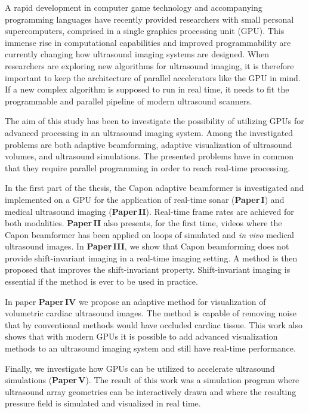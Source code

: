 \documentclass[10pt,b5paper,twoside]{book}
\begin{document}

A rapid development in computer game technology and accompanying programming languages have recently provided researchers with small personal supercomputers, comprised in a single graphics processing unit (GPU). This immense rise in computational capabilities and improved programmability are currently changing how ultrasound imaging systems are designed. When researchers are exploring new algorithms for ultrasound imaging, it is therefore important to keep the architecture of parallel accelerators like the GPU in mind. If a new complex algorithm is supposed to run in real time, it needs to fit the programmable and parallel pipeline of modern ultrasound scanners.

The aim of this study has been to investigate the possibility of utilizing GPUs for advanced processing in an ultrasound imaging system. Among the investigated problems are both adaptive beamforming, adaptive visualization of ultrasound volumes, and ultrasound simulations. The presented problems have in common that they require parallel programming in order to reach real-time processing. 

In the first part of the thesis, the Capon adaptive beamformer is investigated and implemented on a GPU for the application of real-time sonar (\textbf{Paper\,I}) and medical ultrasound imaging (\textbf{Paper\,II}). Real-time frame rates are achieved for both modalities. \textbf{Paper\,II} also presents, for the first time, videos where the Capon beamformer has been applied on loops of simulated and \textit{in vivo} medical ultrasound images. In \textbf{Paper\,III}, we show that Capon beamforming does not provide shift-invariant imaging in a real-time imaging setting. A method is then proposed that improves the shift-invariant property. Shift-invariant imaging is essential if the method is ever to be used in practice.

In paper \textbf{Paper\,IV} we propose an adaptive method for visualization of volumetric cardiac ultrasound images. The method is capable of removing noise that by conventional methods would have occluded cardiac tissue. This work also shows that with modern GPUs it is possible to add advanced visualization methods to an ultrasound imaging system and still have real-time performance.

Finally, we investigate how GPUs can be utilized to accelerate ultrasound simulations (\textbf{Paper\,V}). The result of this work was a simulation program where ultrasound array geometries can be interactively drawn and where the resulting pressure field is simulated and visualized in real time.
\end{document}
